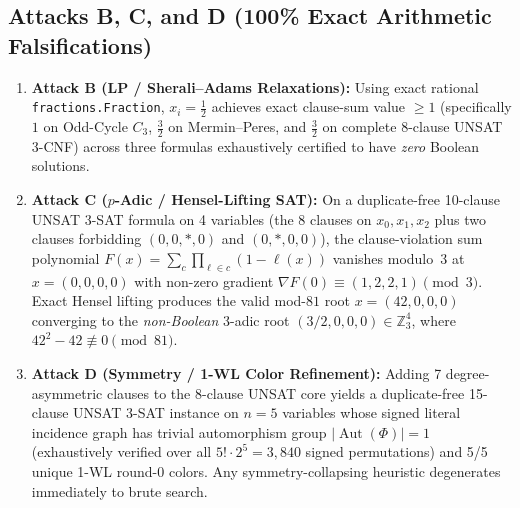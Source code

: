 \documentclass[11pt,reqno]{amsart}
\newcommand{\code}[1]{\texttt{\nolinkurl{#1}}}
\theoremstyle{definition}
\newcommand{\Z}{\mathbb{Z}}
\newcommand{\Aut}{\operatorname{Aut}}
\begin{document}
\subsection{Attacks B, C, and D (100\% Exact Arithmetic Falsifications)}
\begin{enumerate}[leftmargin=1.6em]
\item \textbf{Attack B (LP / Sherali--Adams Relaxations):} Using exact rational
      \code{fractions.Fraction}, $x_i = \frac{1}{2}$ achieves exact clause-sum value
      $\ge 1$ (specifically $1$ on Odd-Cycle $C_3$, $\frac{3}{2}$ on Mermin--Peres, and
      $\frac{3}{2}$ on complete 8-clause UNSAT 3-CNF) across three formulas exhaustively
      certified to have \emph{zero} Boolean solutions.
\item \textbf{Attack C ($p$-Adic / Hensel-Lifting SAT):} On a duplicate-free 10-clause
      UNSAT 3-SAT formula on 4 variables (the 8 clauses on $x_0,x_1,x_2$ plus two clauses
      forbidding $(0,0,*,0)$ and $(0,*,0,0)$), the clause-violation sum polynomial
      $F(x) = \sum_c \prod_{\ell \in c}(1-\ell(x))$ vanishes modulo~3 at $x=(0,0,0,0)$
      with non-zero gradient $\nabla F(0) \equiv (1,2,2,1) \pmod{3}$. Exact Hensel
      lifting produces the valid mod-$81$ root $x = (42, 0, 0, 0)$ converging to the
      \emph{non-Boolean} 3-adic root $(3/2, 0, 0, 0) \in \Z_3^4$, where $42^2 - 42 \not\equiv 0 \pmod{81}$.
\item \textbf{Attack D (Symmetry / 1-WL Color Refinement):} Adding 7 degree-asymmetric
      clauses to the 8-clause UNSAT core yields a duplicate-free 15-clause UNSAT 3-SAT
      instance on $n=5$ variables whose signed literal incidence graph has trivial
      automorphism group $|\Aut(\Phi)| = 1$ (exhaustively verified over all
      $5! \cdot 2^5 = 3{,}840$ signed permutations) and 5/5 unique 1-WL round-0 colors.
      Any symmetry-collapsing heuristic degenerates immediately to brute search.
\end{enumerate}
\end{document}
